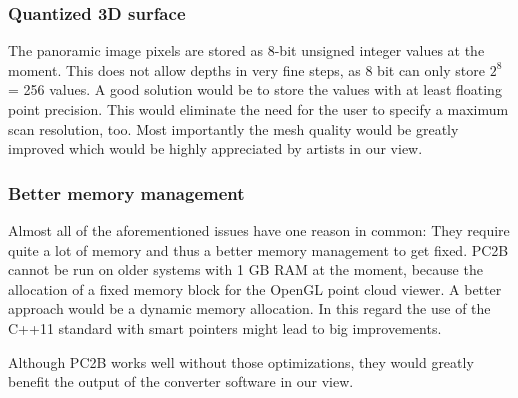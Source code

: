 \subsubsection{Quantized 3D surface}

The panoramic image pixels are stored as 8-bit unsigned integer values at the moment. This does not allow depths in very fine steps, as 8 bit can only store $2^{8}$ = 256 values. A good solution would be to store the values with at least floating point precision. This would eliminate the need for the user to specify a maximum scan resolution, too. Most importantly the mesh quality would be greatly improved which would be highly appreciated by artists in our view.

\subsubsection{Better memory management}

Almost all of the aforementioned issues have one reason in common: They require quite a lot of memory and thus a better memory management to get fixed. PC2B cannot be run on older systems with 1 GB RAM at the moment, because the allocation of a fixed memory block for the OpenGL point cloud viewer. A better approach would be a dynamic memory allocation. In this regard the use of the C++11 standard with smart pointers might lead to big improvements.

Although PC2B works well without those optimizations, they would greatly benefit the output of the converter software in our view.